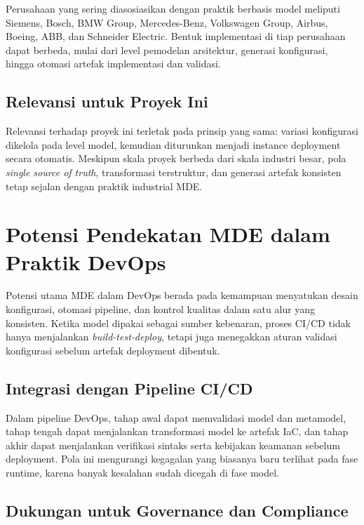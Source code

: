 Perusahaan yang sering diasosiasikan dengan praktik berbasis model meliputi Siemens, Bosch, BMW Group, Mercedes-Benz, Volkswagen Group, Airbus, Boeing, ABB, dan Schneider Electric. Bentuk implementasi di tiap perusahaan dapat berbeda, mulai dari level pemodelan arsitektur, generasi konfigurasi, hingga otomasi artefak implementasi dan validasi.

\subsection[Relevansi untuk Proyek Inisubsec]{Relevansi untuk Proyek Ini}\label{subsec:mde-relevansi-proyek}

Relevansi terhadap proyek ini terletak pada prinsip yang sama: variasi konfigurasi dikelola pada level model, kemudian diturunkan menjadi instance deployment secara otomatis. Meskipun skala proyek berbeda dari skala industri besar, pola \textit{single source of truth}, transformasi terstruktur, dan generasi artefak konsisten tetap sejalan dengan praktik industrial MDE.

\section[Potensi Pendekatan MDE dalam Praktik]{Potensi Pendekatan MDE dalam Praktik DevOps}\label{sec:mde-devops-potensi}

Potensi utama MDE dalam DevOps berada pada kemampuan menyatukan desain konfigurasi, otomasi pipeline, dan kontrol kualitas dalam satu alur yang konsisten. Ketika model dipakai sebagai sumber kebenaran, proses CI/CD tidak hanya menjalankan \textit{build-test-deploy}, tetapi juga menegakkan aturan validasi konfigurasi sebelum artefak deployment dibentuk.

\subsection[Integrasi dengan Pipeline CI/CDsubsec]{Integrasi dengan Pipeline CI/CD}\label{subsec:mde-devops-cicd}

Dalam pipeline DevOps, tahap awal dapat memvalidasi model dan metamodel, tahap tengah dapat menjalankan transformasi model ke artefak IaC, dan tahap akhir dapat menjalankan verifikasi sintaks serta kebijakan keamanan sebelum deployment. Pola ini mengurangi kegagalan yang biasanya baru terlihat pada fase runtime, karena banyak kesalahan sudah dicegah di fase model.

\subsection[Dukungan untuk Governance]{Dukungan untuk Governance dan Compliance}\label{subsec:mde-devops-governance}

